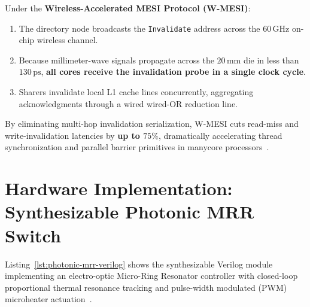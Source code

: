 Under the \textbf{Wireless-Accelerated MESI Protocol (W-MESI)}:
\begin{enumerate}
    \item The directory node broadcasts the \texttt{Invalidate} address across the $60\,\mathrm{GHz}$ on-chip wireless channel.
    \item Because millimeter-wave signals propagate across the $20\,\mathrm{mm}$ die in less than $130\,\mathrm{ps}$, \textbf{all cores receive the invalidation probe in a single clock cycle}.
    \item Sharers invalidate local L1 cache lines concurrently, aggregating acknowledgments through a wired wired-OR reduction line.
\end{enumerate}
By eliminating multi-hop invalidation serialization, W-MESI cuts read-miss and write-invalidation latencies by \textbf{up to $75\%$}, dramatically accelerating thread synchronization and parallel barrier primitives in manycore processors~\cite{Deb2012,Abadal2018,Taghvaee2022}.

\section{Hardware Implementation: Synthesizable Photonic MRR Switch}
\label{sec:photonic-verilog}

Listing~\ref{lst:photonic-mrr-verilog} shows the synthesizable Verilog module implementing an electro-optic Micro-Ring Resonator controller with closed-loop proportional thermal resonance tracking and pulse-width modulated (PWM) microheater actuation~\cite{Ye2013,Kao2026,Wang2021ACO}.

